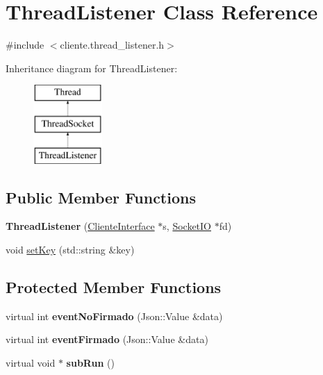\hypertarget{classThreadListener}{\section{Thread\-Listener Class Reference}
\label{classThreadListener}
}


{\ttfamily \#include $<$cliente.\-thread\-\_\-listener.\-h$>$}

Inheritance diagram for Thread\-Listener\-:\begin{figure}[H]
\begin{center}
\leavevmode
\includegraphics[height=3.000000cm]{classThreadListener}
\end{center}
\end{figure}
\subsection*{Public Member Functions}
\begin{DoxyCompactItemize}
\item 
\hypertarget{classThreadListener_a2b74bbe948a95248dfc86dda0d597b45}{{\bfseries Thread\-Listener} (\hyperlink{classClienteInterface}{Cliente\-Interface} $\ast$s, \hyperlink{classSocketIO}{Socket\-I\-O} $\ast$fd)}\label{classThreadListener_a2b74bbe948a95248dfc86dda0d597b45}

\item 
void \hyperlink{classThreadListener_a8fb16a6bf5b346c368cf4a190699eefc}{set\-Key} (std\-::string \&key)
\end{DoxyCompactItemize}
\subsection*{Protected Member Functions}
\begin{DoxyCompactItemize}
\item 
\hypertarget{classThreadListener_a76186eca6fa62382baf0a7835abe3668}{virtual int {\bfseries event\-No\-Firmado} (Json\-::\-Value \&data)}\label{classThreadListener_a76186eca6fa62382baf0a7835abe3668}

\item 
\hypertarget{classThreadListener_a510060ad5fbaa44711574b409b4ccaa8}{virtual int {\bfseries event\-Firmado} (Json\-::\-Value \&data)}\label{classThreadListener_a510060ad5fbaa44711574b409b4ccaa8}

\item 
\hypertarget{classThreadListener_aacfdbbcb7b2f30a7e757e6c4cde14657}{virtual void $\ast$ {\bfseries sub\-Run} ()}\label{classThreadListener_aacfdbbcb7b2f30a7e757e6c4cde14657}

\end{DoxyCompactItemize}
